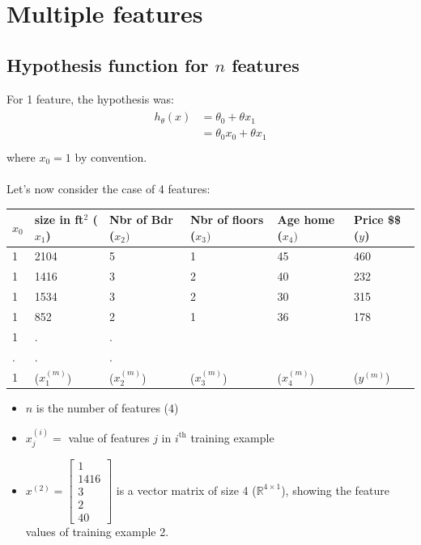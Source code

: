 \documentclass[a4paper,12pt]{report}
\begin{document}
\section{Multiple features}
\subsection{Hypothesis function for $n$ features}
For 1 feature, the hypothesis was:
\begin{align*}
		\begin{split}
				h_{\theta}(x)  & = \theta_0 + \theta x_1 \\
				& = \theta_0 x_0 + \theta x_1  \\
		\end{split}
\end {align*}
where $x_0 = 1$ by convention.  \\ \\

Let's now consider the case of 4 features: \\
{
\centering
\begin{tabular}{ p{1cm} | p{3cm} | p{3cm} | p{3cm} | p{3cm} ||p{2cm}||  }
\hline
\hline
 $x_0$ & size in ft$^2$ ($x_1$)& Nbr of Bdr ($x_2)$ & Nbr of floors ($x_3)$ & Age home ($x_4)$  & Price \$\$ ($y$)\\
 \hline
 1 & 2104   & 5 & 1 & 45 & 460 \\
 1 & 1416   & 3 & 2 & 40 & 232 \\
 1 & 1534   & 3 & 2 & 30 & 315 \\
 1 & 852    & 2 & 1 & 36 & 178 \\
 1 & . &. & & & \\
 . &. &. & &  & \\
1 & ($x_1 ^{(m)}$) & ($x_2 ^{(m)}$) & ($x_3 ^{(m)}$) & ($x_4 ^{(m)}$) & ($y^{(m)}$)\\
\end{tabular}
}

\begin{itemize}
\item $n$ is the number of features (4)
\item $x_j ^{(i)} = $ value of features $j$ in $i^{\mathrm{th}}$ training example
\item $x^{(2)} = \left[ \begin{smallmatrix} 1 \\ 1416 \\ 3 \\ 2 \\ 40 \end{smallmatrix} \right] $
is a vector matrix of size 4 ($\mathbb{R} ^ {4 \times 1}$), showing the feature values of training example 2.
\end{itemize}
\end{document}
